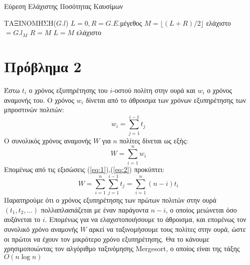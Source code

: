 \documentclass{article}
\begin{document}
\begin{algorithm}

\renewcommand{\algorithmicif}{\textbf{\foreignlanguage{greek}{Αν}}}
\renewcommand{\algorithmicfor}{\textbf{\foreignlanguage{greek}{Για}}}
\renewcommand{\algorithmicend}{\textbf{\foreignlanguage{greek}{Τέλος}}}
\renewcommand{\algorithmicdo}{}
\renewcommand{\algorithmicwhile}{\textbf{\foreignlanguage{greek}{Όσο}}}
\renewcommand{\algorithmicthen}{\textbf{\foreignlanguage{greek}{τότε}}}
\renewcommand{\algorithmicreturn}{\textbf{\foreignlanguage{greek}{Επίστρεψε}}}
\renewcommand{\algorithmicelse}{\textbf{\foreignlanguage{greek}{Αλλιώς}}}
\renewcommand{\algorithmicprocedure}{}

\caption{\foreignlanguage{greek}{Εύρεση Ελάχιστης Ποσότητας Καυσίμων}} \label{alg:mergesort}
\begin{algorithmic}[1]
    \State \foreignlanguage{greek}{ΤΑΞΙΝΟΜΗΣΗ}($ G.l $) 
    \State $ L = 0, R = G.E.$\foreignlanguage{greek}{μέγεθος}
        \State $M = \lfloor (L+R)/2 \rfloor$
            \State \foreignlanguage{greek}{ελάχιστο}$=G.l_M$
            \State $R = M$
        \Else
            \State $L = M$
        \EndIf
    \EndWhile
    \State \Return \foreignlanguage{greek}{ελάχιστο}
    \EndProcedure
\end{algorithmic}    
\end{algorithm}


\section*{Πρόβλημα 2}
Έστω $t_i$ ο χρόνος εξυπηρέτησης του $i$-οστού πολίτη στην ουρά και $w_i$ ο χρόνος αναμονής του. Ο χρόνος $w_i$  δίνεται από το άθροισμα των χρόνων εξυπηρέτησης των μπροστινών πολιτών:
\begin{equation} \label{eq:1}
    w_i = \sum_{j=1}^{i-1}t_j
\end{equation}
Ο συνολικός χρόνος αναμονής $W$ για $n$ πολίτες δίνεται ως εξής:
\begin{equation} \label{eq:2}
    W = \sum_{i=1}^{n}{w_i}
\end{equation}
Επομένως από τις εξισώσεις (\ref{eq:1}),(\ref{eq:2}) προκύπτει:
\begin{displaymath}
    W = \sum_{i=1}^{n}\sum_{j=1}^{i-1}t_j = \sum_{i=1}^{n}{(n-i)t_i}
\end{displaymath}
Παρατηρούμε ότι ο χρόνος εξυπηρέτησης των πρώτων πολιτών στην ουρά $(t_1, t_2,...)$ πολλαπλασιάζεται με έναν παράγοντα $n-i$, ο οποίος μειώνεται όσο αυξάνεται το $i$. Επομένως για να ελαχιστοποιήσουμε το άθροισμα, και επομένως τον συνολικό χρόνο αναμονής $W$ αρκεί να ταξινομήσουμε τους πολίτες στην ουρά, ώστε οι πρώτοι να έχουν τον μικρότερο χρόνο εξυπηρέτησης. Θα το κάνουμε χρησιμοποιώντας τον αλγόριθμο ταξινόμησης \foreignlanguage{english}{Mergesort}\cite{cormen_mergesort}, ο οποίος είναι της τάξης $O(n\log{n})$
\end{document}
